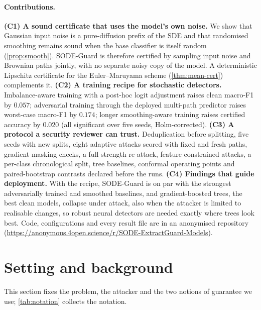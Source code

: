\documentclass{article}
\newcommand{\anonrepo}{\url{https://anonymous.4open.science/r/SODE-ExtractGuard-Models}}
\theoremstyle{definition}
\begin{document}
\paragraph{Contributions.}
\textbf{(C1) A sound certificate that uses the model's own noise.} We show that
Gaussian input noise is a pure-diffusion prefix of the SDE and that randomised
smoothing remains sound when the base classifier is itself random
(\cref{prop:smooth}). SODE-Guard is therefore certified by sampling input noise
and Brownian paths jointly, with no separate noisy copy of the model. A
deterministic Lipschitz certificate for the Euler--Maruyama scheme
(\cref{thm:mean-cert}) complements it.
\textbf{(C2) A training recipe for stochastic detectors.} Imbalance-aware
training with a post-hoc logit adjustment raises clean macro-F1 by $0.057$;
adversarial training through the deployed multi-path predictor raises
worst-case macro-F1 by $0.174$; longer smoothing-aware training raises
certified accuracy by $0.020$ (all significant over five seeds, Holm-corrected).
\textbf{(C3) A protocol a security reviewer can trust.} Deduplication before
splitting, five seeds with new splits, eight adaptive attacks scored with
fixed and fresh paths, gradient-masking checks, a full-strength re-attack,
feature-constrained attacks, a per-class chronological split, tree baselines,
conformal operating points and paired-bootstrap contrasts declared before the
runs.
\textbf{(C4) Findings that guide deployment.} With the recipe, SODE-Guard is on
par with the strongest adversarially trained and smoothed baselines, and
gradient-boosted trees, the best clean models, collapse under attack, also when
the attacker is limited to realisable changes, so robust neural detectors are
needed exactly where trees look best.
Code, configurations and every result file are in an anonymised repository
(\anonrepo).

\section{Setting and background}\label{sec:setting}
This section fixes the problem, the attacker and the two notions of
guarantee we use; \cref{tab:notation} collects the notation.
\end{document}
